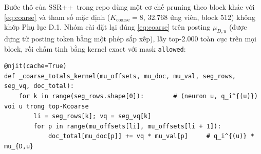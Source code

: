 \documentclass[a4paper,13pt]{extreport}
\theoremstyle{plain}
\newcommand{\ssrpp}{SSR++}
\begin{document}
Bước thô của \ssrpp\ trong repo dùng một cơ chế pruning theo block khác với \eqref{eq:coarse} và tham số mặc định ($K_{\text{coarse}}=8$, 32.768 ứng viên, block 512) không khớp Phụ lục D.1. Nhóm cài đặt lại đúng \eqref{eq:coarse} trên posting $\mu_{D,u}$ (được dựng từ posting token bằng một phép sắp xếp), lấy top-2.000 toàn cục trên mọi block, rồi chấm tinh bằng kernel exact với mask \texttt{allowed}:
\begin{lstlisting}[caption={Kernel chấm điểm thô theo công thức (12).}]
@njit(cache=True)
def _coarse_totals_kernel(mu_offsets, mu_doc, mu_val, seg_rows, seg_vq, doc_total):
    for k in range(seg_rows.shape[0]):        # (neuron u, q_i^{(u)}) voi u trong top-Kcoarse
        li = seg_rows[k]; vq = seg_vq[k]
        for p in range(mu_offsets[li], mu_offsets[li + 1]):
            doc_total[mu_doc[p]] += vq * mu_val[p]     # q_i^{(u)} * mu_{D,u}
\end{lstlisting}
\end{document}
